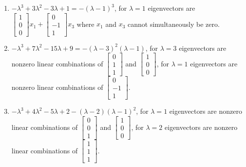 \begin{multicols}{2}
\begin{enumerate}
\begin{enumerate}
	\item 
$-\lambda ^3+3 \lambda ^2-3 \lambda +1=
-(\lambda -1)^3$,
for 
$\lambda=1$
eigenvectors are
$\begin{bmatrix}1\\ 0\\ 0\end{bmatrix}x_1+\begin{bmatrix}0\\ -1\\ 1\end{bmatrix}x_3$ where $x_1$ and $x_3$ cannot simultaneously be zero.


	\item 
$-\lambda ^3+7 \lambda ^2-15 \lambda +9=
-(\lambda -3)^2 (\lambda -1)$,
for 
$\lambda=3$
eigenvectors are nonzero linear combinations of
$\begin{bmatrix}0\\ 1\\ 1\end{bmatrix}$ and $\begin{bmatrix}1\\ 0\\ 0\end{bmatrix}$,
for 
$\lambda=1$
eigenvectors are nonzero linear combinations of
$\begin{bmatrix}0\\ -1\\ 1\end{bmatrix}$.


	\item 
$-\lambda ^3+4 \lambda ^2-5 \lambda +2
-(\lambda -2) (\lambda -1)^2$,
for 
$\lambda=1$
eigenvectors are nonzero linear combinations of
$\begin{bmatrix}0\\ 0\\ 1\end{bmatrix}$ and $\begin{bmatrix}1\\ 0\\ 0\end{bmatrix}$,
for 
$\lambda=2$
eigenvectors are nonzero linear combinations of
$\begin{bmatrix}1\\ 1\\ 1\end{bmatrix}$.


\end{enumerate}


\end{enumerate}
\end{multicols}
